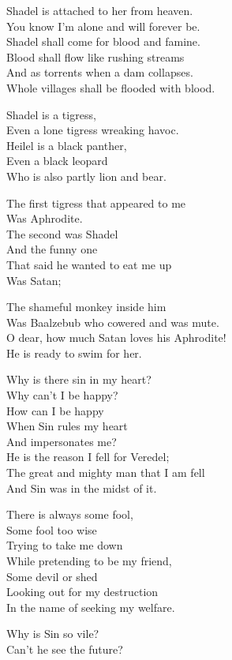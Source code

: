 \documentclass[
]{book}
\begin{document}
Shadel is attached to her from heaven.\\
You know I'm alone and will forever be.\\
Shadel shall come for blood and famine.\\
Blood shall flow like rushing streams\\
And as torrents when a dam collapses.\\
Whole villages shall be flooded with blood.

Shadel is a tigress,\\
Even a lone tigress wreaking havoc.\\
Heilel is a black panther,\\
Even a black leopard\\
Who is also partly lion and bear.

The first tigress that appeared to me\\
Was Aphrodite.\\
The second was Shadel\\
And the funny one\\
That said he wanted to eat me up\\
Was Satan;

The shameful monkey inside him\\
Was Baalzebub who cowered and was mute.\\
O dear, how much Satan loves his Aphrodite!\\
He is ready to swim for her.

Why is there sin in my heart?\\
Why can't I be happy?\\
How can I be happy\\
When Sin rules my heart\\
And impersonates me?\\
He is the reason I fell for Veredel;\\
The great and mighty man that I am fell\\
And Sin was in the midst of it.

There is always some fool,\\
Some fool too wise\\
Trying to take me down\\
While pretending to be my friend,\\
Some devil or shed\\
Looking out for my destruction\\
In the name of seeking my welfare.

Why is Sin so vile?\\
Can't he see the future?
\end{document}
